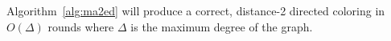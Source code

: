 \begin{thm} Algorithm~\ref{alg:ma2ed} will produce a correct, distance-2 directed coloring in $O(\Delta)$ rounds where $\Delta$ is the maximum degree of the graph.
\label{thm:ma2ed-correct}
\end{thm}
